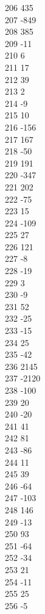 { 206	435 \\
 207	-849 \\
 208	385 \\
 209	-11 \\
 210	6 \\
 211	17 \\
 212	39 \\
 213	2 \\
 214	-9 \\
 215	10 \\
 216	-156 \\
 217	167 \\
 218	-50 \\
 219	191 \\
 220	-347 \\
 221	202 \\
 222	-75 \\
 223	15 \\
 224	-109 \\
 225	27 \\
 226	121 \\
 227	-8 \\
 228	-19 \\
 229	3 \\
 230	-9 \\
 231	52 \\
 232	-25 \\
 233	-15 \\
 234	25 \\
 235	-42 \\
 236	2145 \\
 237	-2120 \\
 238	-100 \\
 239	20 \\
 240	-20 \\
 241	41 \\
 242	81 \\
 243	-86 \\
 244	11 \\
 245	39 \\
 246	-64 \\
 247	-103 \\
 248	146 \\
 249	-13 \\
 250	93 \\
 251	-64 \\
 252	-34 \\
 253	21 \\
 254	-11 \\
 255	25 \\
 256	-5 \\
}
